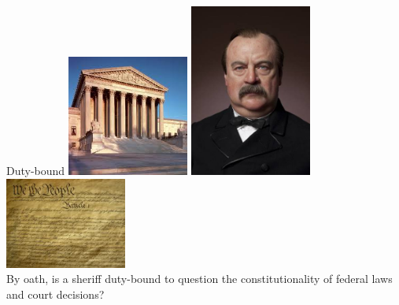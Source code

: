 \begin{frame}{Duty-bound}
    \centering
    \includegraphics[width=0.3\textwidth]{img/court-bldg.png}
    \includegraphics[width=0.3\textwidth]{img/cleveland.png}
    \includegraphics[width=0.3\textwidth]{img/constitution.png} \\
    \vspace{18pt}
    By oath, is a sheriff duty-bound to question the constitutionality of federal laws and court decisions? \\
\end{frame}

